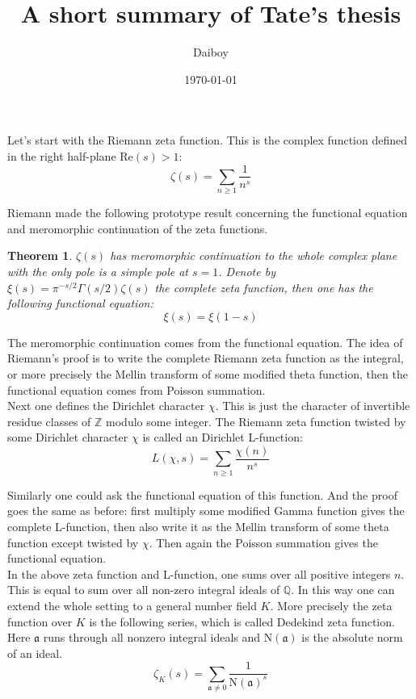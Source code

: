 \documentclass[10pt]{article}
\title{A short summary of Tate's thesis}
\author{Daiboy}
\date{\today}
\theoremstyle{plain}
\newtheorem{thm}{Theorem}
\theoremstyle{remark}
\begin{document}
	\maketitle 
	
	Let's start with the Riemann zeta function. This is the complex function defined in the right half-plane $\mathrm{Re}(s)>1$:
	$$\zeta(s)=\sum_{n\ge1}\frac{1}{n^s}$$
	
	Riemann made the following prototype result concerning the functional equation and meromorphic continuation of the zeta functions.
	\begin{thm}
		$\zeta(s)$ has meromorphic continuation to the whole complex plane with the only pole is a simple pole at $s=1$. Denote by $\xi(s)=\pi^{-s/2}\Gamma(s/2)\zeta(s)$ the complete zeta function, then one has the following functional equation:
		$$\xi(s)=\xi(1-s)$$
	\end{thm}
	
	The meromorphic continuation comes from the functional equation. The idea of Riemann's proof is to write the complete Riemann zeta function as the integral, or more precisely the Mellin transform of some modified theta function, then the functional equation comes from Poisson summation.\\
	
	Next one defines the Dirichlet character $\chi$. This is just the character of invertible residue classes of $\mathbb{Z}$ modulo some integer. The Riemann zeta function twisted by some Dirichlet character $\chi$ is called an Dirichlet L-function:
	$$L(\chi,s)=\sum_{n\ge1}\frac{\chi(n)}{n^s}$$
	
	Similarly one could ask the functional equation of this function. And the proof goes the same as before: first multiply some modified Gamma function gives the complete L-function, then also write it as the Mellin transform of some theta function except twisted by $\chi$. Then again the Poisson summation gives the functional equation.\\
	
	In the above zeta function and L-function, one sums over all positive integers $n$. This is equal to sum over all non-zero integral ideals of $\mathbb{Q}$. In this way one can extend the whole setting to a general number field $K$. More precisely the zeta function over $K$ is the following series, which is called Dedekind zeta function. Here $\mathfrak{a}$ runs through all nonzero integral ideals and $\mathrm{N}(\mathfrak{a})$ is the absolute norm of an ideal.
	$$\zeta_K(s)=\sum_{\mathfrak{a}\not=0}\frac{1}{\mathrm{N}(\mathfrak{a})^s}$$
	
\end{document}
